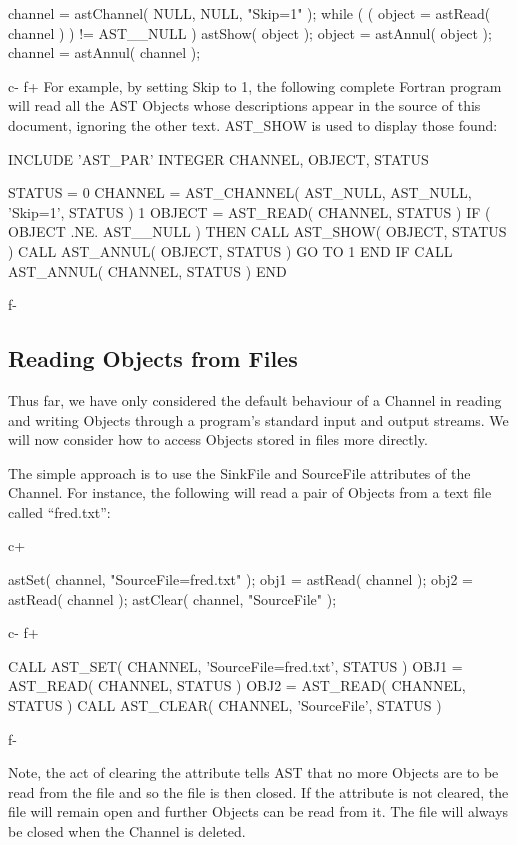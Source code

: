 \documentclass[twoside,11pt]{starlink}
\begin{document}
{\begin{terminalv}
{   channel = astChannel( NULL, NULL, "Skip=1" );
   while ( ( object = astRead( channel ) ) != AST__NULL ) {
      astShow( object );
      object = astAnnul( object );
   }
   channel = astAnnul( channel );
}
\end{terminalv}
\normalsize
c-
f+
For example, by setting Skip to 1, the following complete Fortran
program will read all the AST Objects whose descriptions appear in the
source of this document, ignoring the other text. AST\_SHOW is used to
display those found:

\small
\begin{terminalv}
      INCLUDE 'AST_PAR'
      INTEGER CHANNEL, OBJECT, STATUS

      STATUS = 0
      CHANNEL = AST_CHANNEL( AST_NULL, AST_NULL, 'Skip=1', STATUS )
 1    OBJECT = AST_READ( CHANNEL, STATUS )
      IF ( OBJECT .NE. AST__NULL ) THEN
         CALL AST_SHOW( OBJECT, STATUS )
         CALL AST_ANNUL( OBJECT, STATUS )
         GO TO 1
      END IF
      CALL AST_ANNUL( CHANNEL, STATUS )
      END
\end{terminalv}
\normalsize
f-

\subsection{\label{ss:channelsource}Reading Objects from Files}

Thus far, we have only considered the default behaviour of a Channel
in reading and writing Objects through a program's standard input and
output streams. We will now consider how to access Objects stored in
files more directly.

The simple approach is to use the SinkFile and SourceFile attributes of
the Channel. For instance, the following will read a pair of Objects from
a text file called ``fred.txt'':

c+
\small
\begin{terminalv}
astSet( channel, "SourceFile=fred.txt" );
obj1 = astRead( channel );
obj2 = astRead( channel );
astClear( channel, "SourceFile" );
\end{terminalv}
\normalsize
c-
f+
\small
\begin{terminalv}
   CALL AST_SET( CHANNEL, 'SourceFile=fred.txt', STATUS )
   OBJ1 = AST_READ( CHANNEL, STATUS )
   OBJ2 = AST_READ( CHANNEL, STATUS )
   CALL AST_CLEAR( CHANNEL, 'SourceFile', STATUS )
\end{terminalv}
\normalsize
f-

Note, the act of clearing the attribute tells AST that no more Objects
are to be read from the file and so the file is then closed. If the
attribute is not cleared, the file will remain open and further Objects
can be read from it. The file will always be closed when the Channel is
deleted.

}
\end{document}
